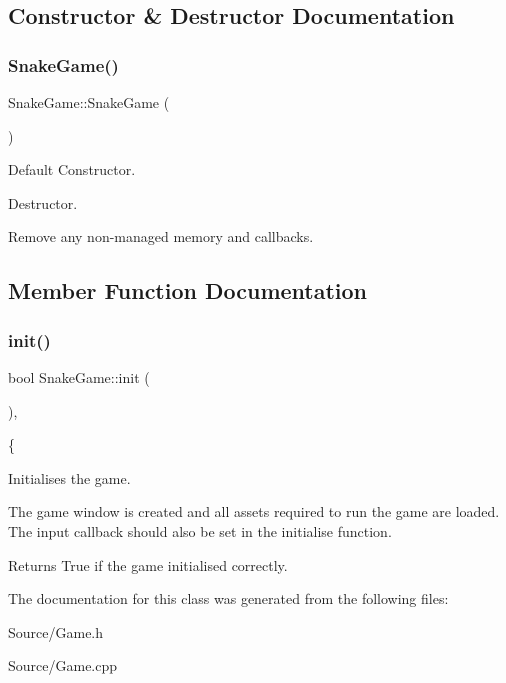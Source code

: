 \subsection{Constructor \& Destructor Documentation}
\mbox{\label{class_snake_game_a2a1202d9c2dc3b420e894b7f1581c3a6}} 
\subsubsection{\texorpdfstring{Snake\+Game()}{SnakeGame()}}
{\footnotesize\ttfamily Snake\+Game\+::\+Snake\+Game (\begin{DoxyParamCaption}{ }\end{DoxyParamCaption})}



Default Constructor. 

Destructor.

Remove any non-\/managed memory and callbacks. 

\subsection{Member Function Documentation}
\mbox{\label{class_snake_game_adf792bb503c35e536d905bca53086bbb}} 
\subsubsection{\texorpdfstring{init()}{init()}}
{\footnotesize\ttfamily bool Snake\+Game\+::init (\begin{DoxyParamCaption}{ }\end{DoxyParamCaption})\hspace{0.3cm}{\ttfamily [override]}, {\ttfamily [virtual]}}



\{ 

Initialises the game.

The game window is created and all assets required to run the game are loaded. The input callback should also be set in the initialise function. \begin{DoxyReturn}{Returns}
True if the game initialised correctly. 
\end{DoxyReturn}


The documentation for this class was generated from the following files\+:\begin{DoxyCompactItemize}
\item 
Source/Game.\+h\item 
Source/Game.\+cpp\end{DoxyCompactItemize}
